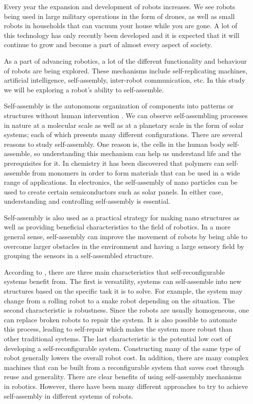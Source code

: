 Every year the expansion and development of robots increases. 
We see robots being used in large military operations in the form of drones, as well as small robots in households that can vacuum your house while you are gone.
A lot of this technology has only recently been developed and it is expected that it will continue to grow and become a part of almost every aspect of society.

As a part of advancing robotics, a lot of the different functionality and behaviour of robots are being explored.
These mechanisms include self-replicating machines, artificial intelligence, self-assembly, inter-robot communication, etc.
In this study we will be exploring a robot's ability to self-assemble. 

Self-assembly is the autonomous organization of components into patterns or structures without human intervention \cite{whitesides_self-assembly_2002}.
We can observe self-assembling processes in nature at a molecular scale \cite{heylighen_science_2001} as well as at a planetary scale in the form of solar systems; each of which presents many different configurations.
There are several reasons to study self-assembly.
One reason is, the cells in the human body self-assemble, so understanding this mechanism can help us understand life and the prerequisites for it.
In chemistry it has been discovered that polymers can self-assemble from monomers in order to form materials that can be used in a wide range of applications\cite{chung_use_2004, siracusa_biodegradable_2008}. 
In electronics, the self-assembly of nano particles can be used to create certain semiconductors such as solar panels\cite{henini_chapter_2008}.
In either case, understanding and controlling self-assembly is essential.

Self-assembly is also used as a practical strategy for making nano structures as well as providing beneficial characteristics to the field of robotics.
In a more general sense, self-assembly can improve the movement of robots by being able to overcome larger obstacles in the environment and having a large sensory field by grouping the sensors in a self-assembled structure.

According to \cite{yim_modular_2007}, there are three main characteristics that self-reconfigurable systems benefit from.
The first is versatility, systems can self-assemble into new structures based on the specific task it is to solve.
For example, the system may change from a rolling robot to a snake robot depending on the situation.
The second characteristic is robustness.
Since the robots are usually homogeneous, one can replace broken robots to repair the system.
It is also possible to automate this process, leading to self-repair which makes the system more robust than other traditional systems.
The last characteristic is the potential low cost of developing a self-reconfigurable system.
Constructing many of the same type of robot generally lowers the overall robot cost.
In addition, there are many complex machines that can be built from  a reconfigurable system that saves cost through reuse and generality.
There are clear benefits of using self-assembly mechanisms in robotics.
However, there have been many different approaches to try to achieve self-assembly in different systems of robots.

